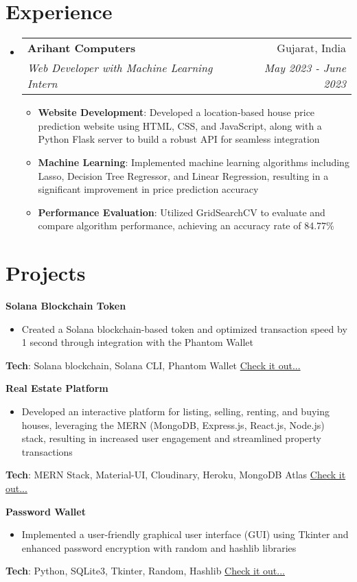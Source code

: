 \documentclass[a4paper,11pt]{article}
\makeatletter
\newcommand{\resumeItem}[2]{\item\small{\textbf{#1}: #2 \vspace{-2pt}}}
\newcommand{\resumeSubheading}[4]{
  \vspace{-1pt}\item
  \begin{tabular*}{0.97\textwidth}{l@{\extracolsep{\fill}}r}
    \textbf{#1} & #2 \\
    \textit{#3} & \textit{#4} \\
  \end{tabular*}\vspace{-5pt}
}
\newcommand{\resumeSubHeadingListStart}{\begin{itemize}[leftmargin=*]}
\newcommand{\resumeSubHeadingListEnd}{\end{itemize}}
\newcommand{\resumeItemListStart}{\begin{itemize}[label={$\bullet$}, leftmargin=*]}
\newcommand{\resumeItemListEnd}{\end{itemize}\vspace{-5pt}}
\makeatother
\begin{document}
\section{\textbf{{\LARGE Experience}}}
\resumeSubHeadingListStart
  \resumeSubheading
  {Arihant Computers}{Gujarat, India}
  {Web Developer with Machine Learning Intern}{May 2023 - June 2023}
  \resumeItemListStart
    \resumeItem{Website Development}
    {Developed a location-based house price prediction website using HTML, CSS, and JavaScript, along with a Python Flask server to build a robust API for seamless integration}
    \resumeItem{Machine Learning}
    {Implemented machine learning algorithms including Lasso, Decision Tree Regressor, and Linear Regression, resulting in a significant improvement in price prediction accuracy}
    \resumeItem{Performance Evaluation}
    {Utilized GridSearchCV to evaluate and compare algorithm performance, achieving an accuracy rate of 84.77\%}
  \resumeItemListEnd
\resumeSubHeadingListEnd

\section{\textbf{{\LARGE Projects}}}
\begin{description}[font=$\bullet$]
  \item{\textbf{Solana Blockchain Token}}
  \resumeItemListStart
    \item Created a Solana blockchain-based token and optimized transaction speed by 1 second through integration with the Phantom Wallet
  \resumeItemListEnd
  \textbf{Tech}: Solana blockchain, Solana CLI, Phantom Wallet
  \hfill \textcolor{blue}{\href{https://solscan.io/token/6BiCMWFN32wQVGqcr9mDiLjerKhitryuatvhxNTYBdfD?cluster=devnet}{Check it out...}}
  
  \item{\textbf{Real Estate Platform}}
  \resumeItemListStart
    \item Developed an interactive platform for listing, selling, renting, and buying houses, leveraging the MERN (MongoDB, Express.js, React.js, Node.js) stack, resulting in increased user engagement and streamlined property transactions
  \resumeItemListEnd
  \textbf{Tech}: MERN Stack, Material-UI, Cloudinary, Heroku, MongoDB Atlas
  \hfill \textcolor{blue}{\href{https://github.com/pinak95/realEstate}{Check it out...}}
  
  \item{\textbf{Password Wallet}}
  \resumeItemListStart
    \item Implemented a user-friendly graphical user interface (GUI) using Tkinter and enhanced password encryption with random and hashlib libraries
  \resumeItemListEnd
  \textbf{Tech}: Python, SQLite3, Tkinter, Random, Hashlib
  \hfill \textcolor{blue}{\href{https://github.com/pinak95/passwordWallet}{Check it out...}}
\end{description}
\end{document}
